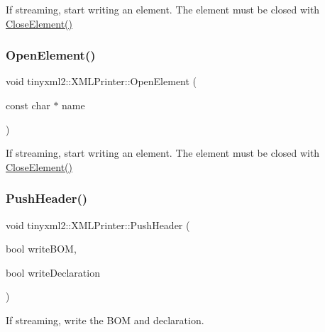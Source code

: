 If streaming, start writing an element. The element must be closed with \hyperlink{classtinyxml2_1_1XMLPrinter_aed6cce4bd414a78b3e2a824803c3ec42}{Close\+Element()} \mbox{\label{classtinyxml2_1_1XMLPrinter_aa10d330818dbc31b44e9ffc27618bdfb}} 
\subsubsection{\texorpdfstring{Open\+Element()}{OpenElement()}\hspace{0.1cm}{\footnotesize\ttfamily [2/2]}}
{\footnotesize\ttfamily void tinyxml2\+::\+X\+M\+L\+Printer\+::\+Open\+Element (\begin{DoxyParamCaption}\item[{const char $\ast$}]{name }\end{DoxyParamCaption})}

If streaming, start writing an element. The element must be closed with \hyperlink{classtinyxml2_1_1XMLPrinter_aed6cce4bd414a78b3e2a824803c3ec42}{Close\+Element()} \mbox{\label{classtinyxml2_1_1XMLPrinter_a178c608ce8476043d5d6513819cde903}} 
\subsubsection{\texorpdfstring{Push\+Header()}{PushHeader()}\hspace{0.1cm}{\footnotesize\ttfamily [1/2]}}
{\footnotesize\ttfamily void tinyxml2\+::\+X\+M\+L\+Printer\+::\+Push\+Header (\begin{DoxyParamCaption}\item[{bool}]{write\+B\+OM,  }\item[{bool}]{write\+Declaration }\end{DoxyParamCaption})}

If streaming, write the B\+OM and declaration. \mbox{\label{classtinyxml2_1_1XMLPrinter_a178c608ce8476043d5d6513819cde903}} 
